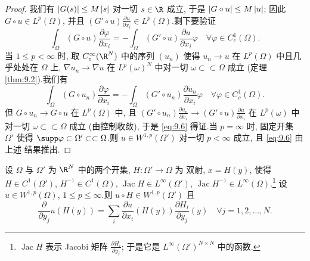 \begin{proof}
我们有 $\left|G(s)\right|\le M\left|s\right|$ 对一切 $s\in\R$ 成立, 于是
$\left|G\circ u\right|\le M\left|u\right|$; 因此 $G\circ u\in L^p(\Omega)$, 并且
$(G'\circ u)\frac{\partial u}{\partial x_i}\in L^p(\Omega)$.剩下要验证
\begin{equation}
\int_\Omega(G\circ u)\frac{\partial\varphi}{\partial x_i}
=-\int_\Omega(G'\circ u)\frac{\partial u}{\partial x_i}\varphi
\quad\forall\varphi\in C_c^1(\Omega).
\label{eq:9.6}
\end{equation}
当 $1\le p<\infty$ 时, 取 $C_c^\infty(\R^N)$ 中的序列 $(u_n)$ 使得
$u_n\to u$ 在 $L^p(\Omega)$ 中且几乎处处在 $\Omega$ 上,
$\nabla u_n\to\nabla u$ 在 $L^p(\omega)^N$ 中对一切
$\omega\subset\subset\Omega$ 成立 (定理  \ref{thm:9.2}).我们有
\begin{equation*}
\int_\Omega(G\circ u_n)\frac{\partial\varphi}{\partial x_i}
=-\int_\Omega(G'\circ u_n)\frac{\partial u_n}{\partial x_i}\varphi
\quad\forall\varphi\in C_c^1(\Omega).
\end{equation*}
但 $G\circ u_n\to G\circ u$ 在 $L^p(\Omega)$ 中, 且
$(G'\circ u_n)\frac{\partial u_n}{\partial x_i}\to
(G'\circ u)\frac{\partial u}{\partial x_i}$ 在 $L^p(\omega)$ 中对一切
$\omega\subset\subset\Omega$ 成立 (由控制收敛), 于是 \eqref{eq:9.6}
得证.当 $p=\infty$ 时, 固定开集 $\Omega'$ 使得
$\supp\varphi\subset\Omega'\subset\subset\Omega$.则
$u\in W^{1,p}(\Omega')$ 对一切 $p<\infty$ 成立, 且 \eqref{eq:9.6} 由上述
结果推出.
\end{proof}

\begin{proposition}[变量替换公式]
\label{prop:9.6}
设 $\Omega$ 与 $\Omega'$ 为 $\R^N$ 中的两个开集, $H:\Omega'\to\Omega$ 为
双射, $x=H(y)$, 使得 $H\in C^1(\Omega')$, $H^{-1}\in C^1(\Omega)$,
$\operatorname{Jac}H\in L^\infty(\Omega')$,
$\operatorname{Jac}H^{-1}\in L^\infty(\Omega)$.\footnote{$\operatorname{Jac}H$
表示 Jacobi 矩阵 $\frac{\partial H_i}{\partial y_j}$; 于是它是
$L^\infty(\Omega')^{N\times N}$ 中的函数.} 设 $u\in W^{1,p}(\Omega)$,
$1\le p\le\infty$.则 $u\circ H\in W^{1,p}(\Omega')$ 且
\begin{equation*}
\frac{\partial}{\partial y_j}u(H(y))=\sum_i
\frac{\partial u}{\partial x_i}(H(y))\frac{\partial H_i}{\partial y_j}(y)
\quad\forall j=1,2,\dots,N.
\end{equation*}
\end{proposition}

